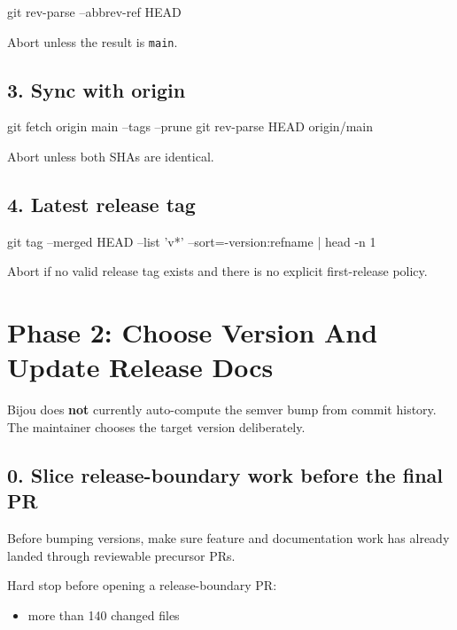 \begin{CodeBlock}
git rev-parse --abbrev-ref HEAD
\end{CodeBlock}

Abort unless the result is \texttt{m\allowbreak{}a\allowbreak{}i\allowbreak{}n}.

\subsection{3. Sync with origin}\label{record-274-sync-with-origin}

\begin{CodeBlock}
git fetch origin main --tags --prune
git rev-parse HEAD origin/main
\end{CodeBlock}

Abort unless both SHAs are identical.

\subsection{4. Latest release tag}\label{record-274-latest-release-tag}

\begin{CodeBlock}
git tag --merged HEAD --list 'v*' --sort=-version:refname | head -n 1
\end{CodeBlock}

Abort if no valid release tag exists and there is no explicit first-release policy.

\section{Phase 2: Choose Version And Update Release Docs}\label{record-274-phase-2-choose-version-and-update-release-docs}

Bijou does \textbf{not} currently auto-compute the semver bump from commit history. The maintainer chooses the target version deliberately.

\subsection{0. Slice release-boundary work before the final PR}\label{record-274-slice-release-boundary-work-before-the-final-pr}

Before bumping versions, make sure feature and documentation work has already landed through reviewable precursor PRs.

Hard stop before opening a release-boundary PR:

\begin{itemize}
\tightlist
\item
  more than 140 changed files
\end{itemize}

